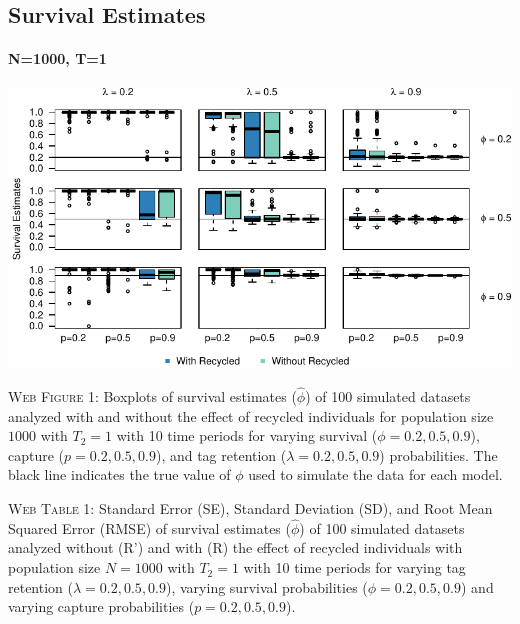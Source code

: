 \documentclass[]{article}
\let\oldparagraph\paragraph
\renewcommand{\paragraph}[1]{\oldparagraph{#1}\mbox{}}
\begin{document}
\newpage 

\subsection{Survival Estimates}\label{survival-estimates}

\paragraph{N=1000, T=1}\label{n1000-t1}

\includegraphics{Appendix_files/figure-latex/figure1_survival_GJSTL1-1.pdf}

\textsc{Web Figure 1:} Boxplots of survival estimates (\(\hat{\phi}\))
of 100 simulated datasets analyzed with and without the effect of
recycled individuals for population size \(1000\) with \(T_2=1\) with 10
time periods for varying survival (\(\phi=0.2,0.5,0.9\)), capture
(\(p=0.2,0.5,0.9\)), and tag retention (\(\lambda=0.2,0.5,0.9\))
probabilities. The black line indicates the true value of \(\phi\) used
to simulate the data for each model.

\textsc{Web Table 1:} Standard Error (SE), Standard Deviation (SD), and
Root Mean Squared Error (RMSE) of survival estimates (\(\hat{\phi}\)) of
100 simulated datasets analyzed without (R') and with (R) the effect of
recycled individuals with population size \(N=1000\) with \(T_2=1\) with
10 time periods for varying tag retention (\(\lambda=0.2,0.5,0.9\)),
varying survival probabilities (\(\phi=0.2,0.5,0.9\)) and varying
capture probabilities (\(p=0.2,0.5,0.9\)).
\end{document}
